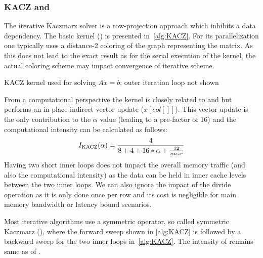 \subsubsection{KACZ and \SYMMKACZ}
The iterative Kaczmarz solver is a row-projection approach which inhibits a data dependency. The basic kernel (\KACZ) is  presented in~\cref{alg:KACZ}. For its parallelization one typically uses a distance-2 coloring of the graph representing the matrix. As this does not lead to the exact result as for the serial execution of the kernel, the actual coloring scheme may impact convergence of iterative scheme.
\begin{algorithm}[H]
	\caption{KACZ kernel used for solving $Ax=b$; outer iteration loop not shown} 
	\label{alg:KACZ}
	\begin{algorithmic}[1]
		\ENDFOR
		\ENDFOR
		\ENDFOR
	\end{algorithmic}
\end{algorithm}
From a computational perspective the kernel is closely related to \SpMV and \SymmSpmv but performs an in-place indirect vector update ($x[col[]]$). This vector update is the only contribution to the $\alpha$ value (leading to a pre-factor of $16$) and the computational intensity can be calculated as follows:
\begin{equation}
\label{eq:KACZ_intensity}
I_\mathrm{KACZ} (\alpha)=  \frac{4}{8+4+16*\alpha+\frac{12}{nnzr}} \\%
\end{equation}
Having two short inner loops does not impact the overall memory traffic (and also the computational intensity) as the data can be held in inner cache levels between the two inner loops. We can also ignore the impact of the divide operation as it is only done once per row and its cost is negligible for main memory bandwidth or latency bound scenarios.  

Most iterative algorithms use a symmetric operator, so called symmetric Kaczmarz (\SYMMKACZ), where the forward sweep shown in \cref{alg:KACZ} is followed by a backward sweep  for the two inner loops in~\cref{alg:KACZ}. The intensity of \SYMMKACZ remains same as of \KACZ. 

